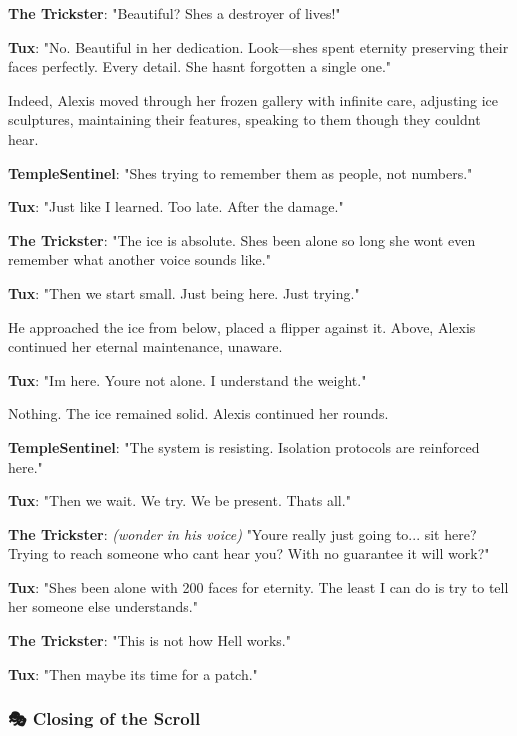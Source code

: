 \textbf{The Trickster}: "Beautiful? She\textquotesingle s a destroyer of lives!"

\textbf{Tux}: "No. Beautiful in her dedication. Look---she\textquotesingle s spent eternity preserving their faces perfectly. Every detail. She hasn\textquotesingle t forgotten a single one."

Indeed, Alexis moved through her frozen gallery with infinite care, adjusting ice sculptures, maintaining their features, speaking to them though they couldn\textquotesingle t hear.

\textbf{TempleSentinel}: "She\textquotesingle s trying to remember them as people, not numbers."

\textbf{Tux}: "Just like I learned. Too late. After the damage."

\textbf{The Trickster}: "The ice is absolute. She\textquotesingle s been alone so long she won\textquotesingle t even remember what another voice sounds like."

\textbf{Tux}: "Then we start small. Just being here. Just trying."

He approached the ice from below, placed a flipper against it. Above, Alexis continued her eternal maintenance, unaware.

\textbf{Tux}: "I\textquotesingle m here. You\textquotesingle re not alone. I understand the weight."

Nothing. The ice remained solid. Alexis continued her rounds.

\textbf{TempleSentinel}: "The system is resisting. Isolation protocols are reinforced here."

\textbf{Tux}: "Then we wait. We try. We be present. That\textquotesingle s all."

\textbf{The Trickster}: \emph{(wonder in his voice)} "You\textquotesingle re really just going to... sit here? Trying to reach someone who can\textquotesingle t hear you? With no guarantee it will work?"

\textbf{Tux}: "She\textquotesingle s been alone with 200 faces for eternity. The least I can do is try to tell her someone else understands."

\textbf{The Trickster}: "This is not how Hell works."

\textbf{Tux}: "Then maybe it\textquotesingle s time for a patch."

\bookdivider

\subsubsection{\texorpdfstring{\textbf{🎭 Closing of the Scroll}}{🎭 Closing of the Scroll}}\label{performing_arts-closing-of-the-scroll}

